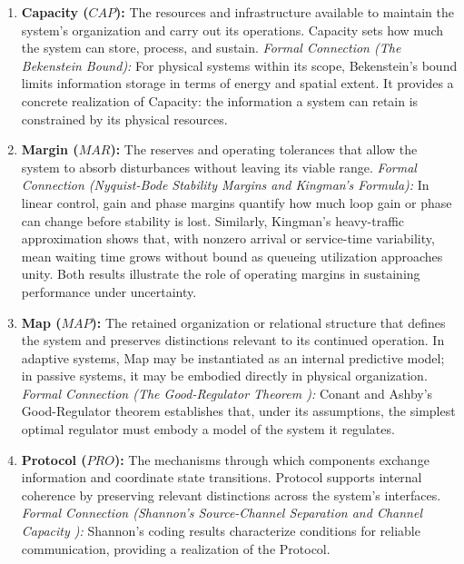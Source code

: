 \begin{enumerate}[label={}, leftmargin=0pt]
    \item \textbf{Capacity ($CAP$):}
    The resources and infrastructure available to maintain the system's organization and carry out its operations. Capacity sets how much the system can store, process, and sustain.
    \textit{Formal Connection (The Bekenstein Bound\cite{bekenstein_universal_1981}):} For physical systems within its scope, Bekenstein's bound limits information storage in terms of energy and spatial extent. It provides a concrete realization of Capacity: the information a system can retain is constrained by its physical resources.

    \item \textbf{Margin ($MAR$):}
    The reserves and operating tolerances that allow the system to absorb disturbances without leaving its viable range.
    \textit{Formal Connection (Nyquist-Bode Stability Margins\cite{nyquist_regeneration_1932} and Kingman's Formula\cite{kingman_single_1961}):} In linear control, gain and phase margins quantify how much loop gain or phase can change before stability is lost. Similarly, Kingman's heavy-traffic approximation shows that, with nonzero arrival or service-time variability, mean waiting time grows without bound as queueing utilization approaches unity. Both results illustrate the role of operating margins in sustaining performance under uncertainty.

    \item \textbf{Map ($MAP$):}
    The retained organization or relational structure that defines the system and preserves distinctions relevant to its continued operation. In adaptive systems, Map may be instantiated as an internal predictive model; in passive systems, it may be embodied directly in physical organization.
    \textit{Formal Connection (The Good-Regulator Theorem \cite{conant_every_1970}):} Conant and Ashby's Good-Regulator theorem establishes that, under its assumptions, the simplest optimal regulator must embody a model of the system it regulates.

    \item \textbf{Protocol ($PRO$):}
    The mechanisms through which components exchange information and coordinate state transitions. Protocol supports internal coherence by preserving relevant distinctions across the system's interfaces.
    \textit{Formal Connection (Shannon's Source-Channel Separation and Channel Capacity \cite{shannon_mathematical_1948}):} Shannon's coding results characterize conditions for reliable communication, providing a realization of the Protocol.


\end{enumerate}
